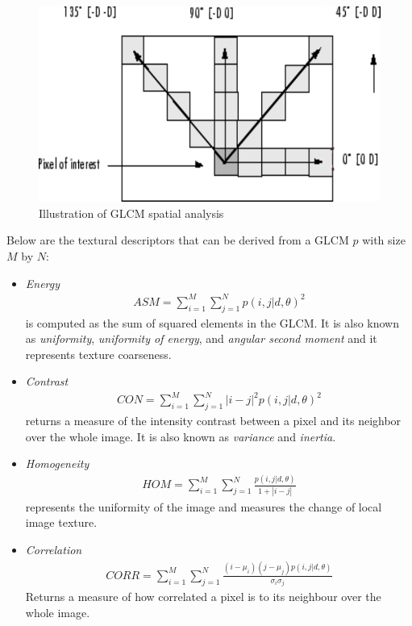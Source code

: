 \begin{figure}[ht!]
\centering
\includegraphics[scale=0.55]{Images/glcm_direction}
\caption{Illustration of GLCM spatial analysis \cite{REF24}}
\label{fig:columnfigure}
\end{figure}

Below are the textural descriptors that can be derived from a GLCM $p$ with size $M$ by $N$:
\begin{itemize}
\item \textit{Energy}\\
\begin{align*}
ASM = \sum_{i=1}^{M}\sum_{j=1}^{N} p(i,j|d,\theta)^2
\end{align*}
is computed as the sum of squared elements in the GLCM. It is also known as \textit{uniformity}, \textit{uniformity of energy}, and \textit{angular second moment} and it represents texture coarseness.\\

\item \textit{Contrast}\\
\begin{align*}
CON = \sum_{i=1}^{M}\sum_{j=1}^{N} |i-j|^2p(i,j|d,\theta)^2
\end{align*}
returns a measure of the intensity contrast between a pixel and its neighbor over the whole image. It is also known as \textit{variance} and \textit{inertia}.

\item \textit{Homogeneity}\\
\begin{align*}
HOM = \sum_{i=1}^{M}\sum_{j=1}^{N} \frac{p(i,j|d,\theta)}{1 + |i - j|}
\end{align*}
represents the uniformity of the image and measures the change of local image texture.

\item \textit{Correlation}\\
\begin{align*}
CORR = \sum_{i=1}^{M}\sum_{j=1}^{N} \frac{(i -\mu_i)(j - \mu_j)p(i,j|d,\theta)}{\sigma_i\sigma_j}
\end{align*}
Returns a measure of how correlated a pixel is to its neighbour over the whole image.\\

\end{itemize}

